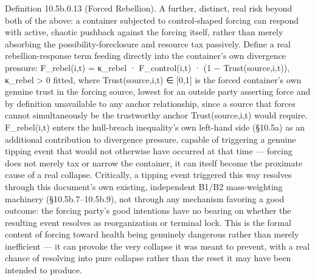 \documentclass[
]{article}
\begin{document}
Definition 10.5b.0.13 (Forced Rebellion). A further, distinct, real risk
beyond both of the above: a container subjected to control-shaped
forcing can respond with active, chaotic pushback against the forcing
itself, rather than merely absorbing the possibility-foreclosure and
resource tax passively. Define a real rebellion-response term feeding
directly into the container's own divergence pressure: F\_rebel(i,t) =
κ\_rebel · F\_control(i,t) · (1 − Trust(source,i,t)), κ\_rebel
\textgreater{} 0 fitted, where Trust(source,i,t) ∈ {[}0,1{]} is the
forced container's own genuine trust in the forcing source, lowest for
an outside party asserting force and by definition unavailable to any
anchor relationship, since a source that forces cannot simultaneously be
the trustworthy anchor Trust(source,i,t) would require. F\_rebel(i,t)
enters the hull-breach inequality's own left-hand side (§10.5a) as an
additional contribution to divergence pressure, capable of triggering a
genuine tipping event that would not otherwise have occurred at that
time --- forcing does not merely tax or narrow the container, it can
itself become the proximate cause of a real collapse. Critically, a
tipping event triggered this way resolves through this document's own
existing, independent B1/B2 mass-weighting machinery
(§10.5b.7--10.5b.9), not through any mechanism favoring a good outcome:
the forcing party's good intentions have no bearing on whether the
resulting event resolves as reorganization or terminal lock. This is the
formal content of forcing toward health being genuinely dangerous rather
than merely inefficient --- it can provoke the very collapse it was
meant to prevent, with a real chance of resolving into pure collapse
rather than the reset it may have been intended to produce.
\end{document}
